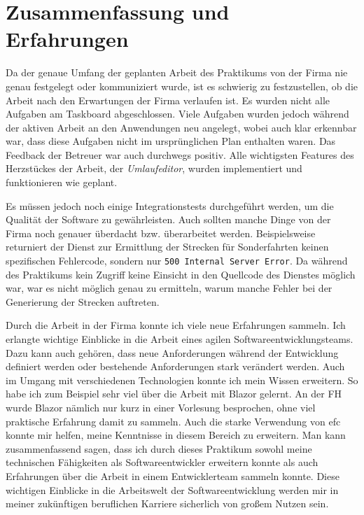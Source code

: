 \chapter{Zusammenfassung und Erfahrungen}\label{ch:ZusammenfassungundErfahrungen}
    Da der genaue Umfang der geplanten Arbeit des Praktikums von der Firma nie genau festgelegt oder kommuniziert wurde,
    ist es schwierig zu festzustellen, ob die Arbeit nach den Erwartungen der Firma verlaufen ist. Es wurden nicht alle Aufgaben am Taskboard abgeschlossen. 
    Viele Aufgaben wurden jedoch während der aktiven Arbeit an den Anwendungen neu angelegt, wobei auch klar erkennbar war, dass
    diese Aufgaben nicht im ursprünglichen Plan enthalten waren. Das Feedback der Betreuer war auch durchwegs positiv. Alle wichtigsten Features des Herzstückes 
    der Arbeit, der \emph{Umlaufeditor}, wurden implementiert und funktionieren wie geplant.

    Es müssen jedoch noch einige Integrationstests durchgeführt werden, um die Qualität der Software zu gewährleisten. Auch sollten manche Dinge von der 
    Firma noch genauer überdacht bzw. überarbeitet werden. Beispielsweise returniert der Dienst zur Ermittlung der Strecken für
    Sonderfahrten keinen spezifischen Fehlercode, sondern nur \texttt{500 Internal Server Error}. Da während des Praktikums kein Zugriff keine Einsicht in den Quellcode
    des Dienstes möglich war, war es nicht möglich genau zu ermitteln, warum manche Fehler bei der Generierung der Strecken auftreten.

    Durch die Arbeit in der Firma konnte ich viele neue Erfahrungen sammeln. Ich erlangte wichtige Einblicke in die Arbeit eines agilen Softwareentwicklungsteams.
    Dazu kann auch gehören, dass neue Anforderungen während der Entwicklung definiert werden oder bestehende Anforderungen stark verändert werden.
    Auch im Umgang mit verschiedenen Technologien konnte ich mein Wissen erweitern. So habe ich zum Beispiel sehr viel über die Arbeit mit Blazor gelernt. An der FH 
    wurde Blazor nämlich nur kurz in einer Vorlesung besprochen, ohne viel praktische Erfahrung damit zu sammeln. Auch die starke Verwendung von \gls{efc} konnte mir 
    helfen, meine Kenntnisse in diesem Bereich zu erweitern. 
    Man kann zusammenfassend sagen, dass ich durch dieses Praktikum sowohl meine technischen Fähigkeiten als 
    Softwareentwickler erweitern konnte als auch Erfahrungen über die Arbeit in einem Entwicklerteam sammeln konnte. Diese wichtigen Einblicke in die Arbeitswelt
    der Softwareentwicklung werden mir in meiner zukünftigen beruflichen Karriere sicherlich von großem Nutzen sein.

